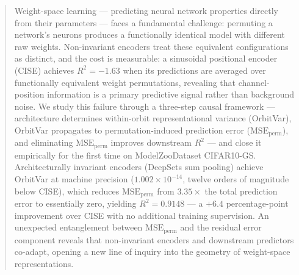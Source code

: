 \begin{abstract}
Weight-space learning --- predicting neural network properties directly from their parameters --- faces a fundamental challenge: permuting a network's neurons produces a functionally identical model with different raw weights. Non-invariant encoders treat these equivalent configurations as distinct, and the cost is measurable: a sinusoidal positional encoder (CISE) achieves $R^2 = -1.63$ when its predictions are averaged over functionally equivalent weight permutations, revealing that channel-position information is a primary predictive signal rather than background noise. We study this failure through a three-step causal framework --- architecture determines within-orbit representational variance (OrbitVar), OrbitVar propagates to permutation-induced prediction error ($\text{MSE}_\text{perm}$), and eliminating $\text{MSE}_\text{perm}$ improves downstream $R^2$ --- and close it empirically for the first time on ModelZooDataset CIFAR10-GS. Architecturally invariant encoders (DeepSets sum pooling) achieve OrbitVar at machine precision ($1.002 \times 10^{-14}$, twelve orders of magnitude below CISE), which reduces $\text{MSE}_\text{perm}$ from $3.35\times$ the total prediction error to essentially zero, yielding $R^2 = 0.9148$ --- a $+6.4$ percentage-point improvement over CISE with no additional training supervision. An unexpected entanglement between $\text{MSE}_\text{perm}$ and the residual error component reveals that non-invariant encoders and downstream predictors co-adapt, opening a new line of inquiry into the geometry of weight-space representations.
\end{abstract}
